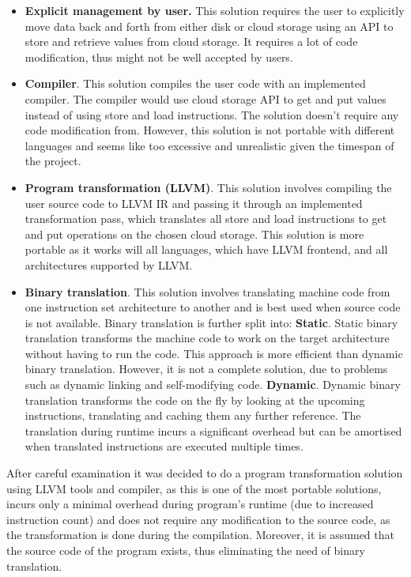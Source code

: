 \documentclass[bsc,frontabs,twoside,singlespacing,parskip,deptreport]{infthesis}     %
\begin{document}
\begin{itemize}
\item
\textbf{Explicit management by user.} This solution requires the user to explicitly move data back and forth from either disk or cloud storage using an API to store and retrieve values from cloud storage. It requires a lot of code modification, thus might not be well accepted by users.
\item
\textbf{Compiler}. This solution compiles the user code with an implemented compiler. The compiler would use cloud storage API to get and put values instead of using store and load instructions. The solution doesn't require any code modification from. However, this solution is not portable with different languages and seems like too excessive and unrealistic given the timespan of the project.
\item
\textbf{Program transformation (LLVM)}. This solution involves compiling the user source code to LLVM IR and passing it through an implemented transformation pass, which translates all store and load instructions to get and put operations on the chosen cloud storage. This solution is more portable as it works will all languages, which have LLVM frontend, and all architectures supported by LLVM.
\item
\textbf{Binary translation}. This solution involves translating machine code from one instruction set architecture to another and is best used when source code is not available. Binary translation is further split into:
\subitem
\textbf{Static}. Static binary translation transforms the machine code to work on the target architecture without having to run the code. This approach is more efficient than dynamic binary translation. However, it is not a complete solution, due to problems such as dynamic linking and self-modifying code.
\subitem
\textbf{Dynamic}. Dynamic binary translation transforms the code on the fly by looking at the upcoming instructions, translating and caching them any further reference. The translation during runtime incurs a significant overhead but can be amortised when translated instructions are executed multiple times.
\end{itemize}

After careful examination it was decided to do a program transformation solution using LLVM tools and compiler, as this is one of the most portable solutions, incurs only a minimal overhead during program's runtime (due to increased instruction count) and does not require any modification to the source code, as the transformation is done during the compilation. Moreover, it is assumed that the source code of the program exists, thus eliminating the need of binary translation.
\end{document}
